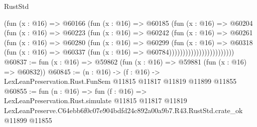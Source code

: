 \begin{lexlean}{RustStd}
\begin{coremodule}
                              (fun (x : @16) =>
                              @60166
                                (fun (x : @16) =>
                                @60185
                                  (fun (x : @16) =>
                                  @60204
                                    (fun (x : @16) =>
                                    @60223
                                      (fun (x : @16) =>
                                      @60242
                                        (fun (x : @16) =>
                                        @60261
                                          (fun (x : @16) =>
                                          @60280
                                            (fun (x : @16) =>
                                            @60299
                                              (fun (x : @16) =>
                                              @60318
                                                (fun (x : @16) =>
                                                @60337
                                                  (fun (x : @16) => @60784))))))))))))))))))))))))
@60837 := fun (x : @16) => @59862 (fun (x : @16) => @59881 (fun (x : @16) => @60832))
@60845 := (n : @16) ->
  (f : @16) -> LexLeanPreservation.Rust.FunSem @11815 @11817 @11819 @11899 @11855
@60855 := fun (n : @16) =>
  fun (f : @16) =>
  LexLeanPreservation.Rust.simulate
    @11815
    @11817
    @11819
    LexLeanPreserve.C64ebb6f0c07e904bdfd24c892a00a9b7.R43.RustStd.crate_ok
    @11899
    @11855
\end{coremodule}
\end{lexlean}
